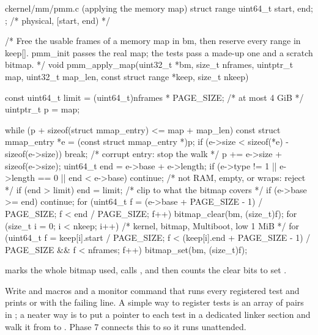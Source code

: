 \documentclass[11pt,a4paper]{article}
\begin{document}
\begin{lst}{c}{kernel/mm/pmm.c (applying the memory map)}
struct range { uint64_t start, end; };              /* physical, [start, end) */

/* Free the usable frames of a memory map in bm, then reserve every range in keep[].
   pmm_init passes the real map; the tests pass a made-up one and a scratch bitmap. */
void pmm_apply_map(uint32_t *bm, size_t nframes, uintptr_t map, uint32_t map_len,
                   const struct range *keep, size_t nkeep)
{
    const uint64_t limit = (uint64_t)nframes * PAGE_SIZE;     /* at most 4 GiB */
    uintptr_t p = map;

    while (p + sizeof(struct mmap_entry) <= map + map_len) {
        const struct mmap_entry *e = (const struct mmap_entry *)p;
        if (e->size < sizeof(*e) - sizeof(e->size))
            break;                                  /* corrupt entry: stop the walk     */
        p += e->size + sizeof(e->size);
        uint64_t end = e->base + e->length;
        if (e->type != 1 || e->length == 0 || end < e->base)
            continue;                               /* not RAM, empty, or wraps: reject */
        if (end > limit)
            end = limit;                            /* clip to what the bitmap covers   */
        if (e->base >= end)
            continue;
        for (uint64_t f = (e->base + PAGE_SIZE - 1) / PAGE_SIZE; f < end / PAGE_SIZE; f++)
            bitmap_clear(bm, (size_t)f);
    }
    for (size_t i = 0; i < nkeep; i++)              /* kernel, bitmap, Multiboot, low 1 MiB */
        for (uint64_t f = keep[i].start / PAGE_SIZE;
             f < (keep[i].end + PAGE_SIZE - 1) / PAGE_SIZE && f < nframes; f++)
            bitmap_set(bm, (size_t)f);
}
\end{lst}
 marks the whole bitmap used, calls , and then counts the clear bits to set
.


Write  and  macros and a  monitor command that runs every
registered test and prints  or  with the failing line. A simple way to register tests is an
array of  pairs in ; a neater way is to put a pointer to each test in a
dedicated linker section and walk it from  to . Phase 7 connects this to
 so it runs unattended.
\end{document}
